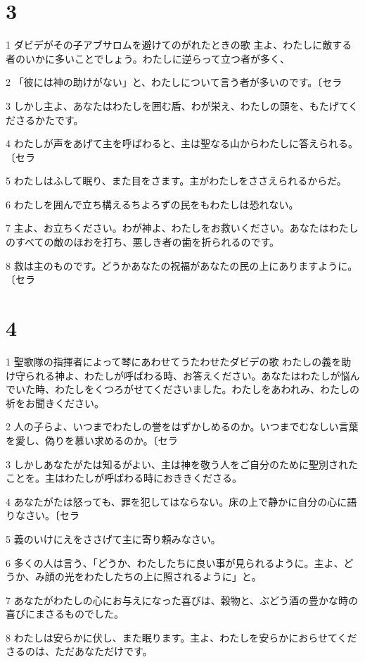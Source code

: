 \chapter{3}

\par 1 ダビデがその子アブサロムを避けてのがれたときの歌 主よ、わたしに敵する者のいかに多いことでしょう。わたしに逆らって立つ者が多く、
\par 2 「彼には神の助けがない」と、わたしについて言う者が多いのです。〔セラ
\par 3 しかし主よ、あなたはわたしを囲む盾、わが栄え、わたしの頭を、もたげてくださるかたです。
\par 4 わたしが声をあげて主を呼ばわると、主は聖なる山からわたしに答えられる。〔セラ
\par 5 わたしはふして眠り、また目をさます。主がわたしをささえられるからだ。
\par 6 わたしを囲んで立ち構えるちよろずの民をもわたしは恐れない。
\par 7 主よ、お立ちください。わが神よ、わたしをお救いください。あなたはわたしのすべての敵のほおを打ち、悪しき者の歯を折られるのです。
\par 8 救は主のものです。どうかあなたの祝福があなたの民の上にありますように。〔セラ

\chapter{4}

\par 1 聖歌隊の指揮者によって琴にあわせてうたわせたダビデの歌 わたしの義を助け守られる神よ、わたしが呼ばわる時、お答えください。あなたはわたしが悩んでいた時、わたしをくつろがせてくださいました。わたしをあわれみ、わたしの祈をお聞きください。
\par 2 人の子らよ、いつまでわたしの誉をはずかしめるのか。いつまでむなしい言葉を愛し、偽りを慕い求めるのか。〔セラ
\par 3 しかしあなたがたは知るがよい、主は神を敬う人をご自分のために聖別されたことを。主はわたしが呼ばわる時におききくださる。
\par 4 あなたがたは怒っても、罪を犯してはならない。床の上で静かに自分の心に語りなさい。〔セラ
\par 5 義のいけにえをささげて主に寄り頼みなさい。
\par 6 多くの人は言う、「どうか、わたしたちに良い事が見られるように。主よ、どうか、み顔の光をわたしたちの上に照されるように」と。
\par 7 あなたがわたしの心にお与えになった喜びは、穀物と、ぶどう酒の豊かな時の喜びにまさるものでした。
\par 8 わたしは安らかに伏し、また眠ります。主よ、わたしを安らかにおらせてくださるのは、ただあなただけです。


